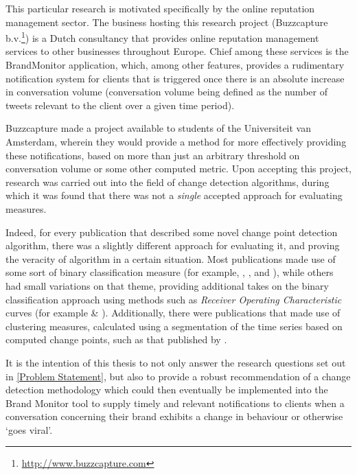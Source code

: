 \documentclass[../main.tex]{subfiles}
\begin{document}
This particular research is motivated specifically by the online reputation management sector. The business hosting this research project (Buzzcapture b.v.\footnote{\url{http://www.buzzcapture.com}}) is a Dutch consultancy that provides online reputation management services to other businesses throughout Europe. Chief among these services is the BrandMonitor application, which, among other features, provides a rudimentary notification system for clients that is triggered once there is an absolute increase in conversation volume (conversation volume being defined as the number of tweets relevant to the client over a given time period).

Buzzcapture made a project available to students of the Universiteit van Amsterdam, wherein they would provide a method for more effectively providing these notifications, based on more than just an arbitrary threshold on conversation volume or some other computed metric. Upon accepting this project, research was carried out into the field of change detection algorithms, during which it was found that there was not a \emph{single} accepted approach for evaluating measures.

Indeed, for every publication that described some novel change point detection algorithm, there was a slightly different approach for evaluating it, and proving the veracity of algorithm in a certain situation. Most publications made use of some sort of binary classification measure (for example, \citeauthor{Qahtan2015} \cite{Qahtan2015}, \citeauthor{Buntain2014} \cite{Buntain2014}, and \citeauthor{Pelecanos2010} \cite{Pelecanos2010}), while others had small variations on that theme, providing additional takes on the binary classification approach using methods such as \emph{Receiver Operating Characteristic} curves (for example \citeauthor{Fawcett1999} \cite{Fawcett1999} \& \citeauthor{Desobry2005} \cite{Desobry2005}). Additionally, there were publications that made use of clustering measures, calculated using a segmentation of the time series based on computed change points, such as that published by \citeauthor{Matteson2012} \cite{Matteson2012}.

It is the intention of this thesis to not only answer the research questions set out in \autoref{Problem Statement}, but also to provide a robust recommendation of a change detection methodology which could then eventually be implemented into the Brand Monitor tool to supply timely and relevant notifications to clients when a conversation concerning their brand exhibits a change in behaviour or otherwise `goes viral'.
\end{document}
